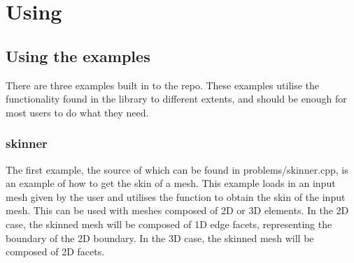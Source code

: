 \documentclass[12pt, letterpaper]{article}
\begin{document}
\section{Using}
\subsection{Using the examples}
There are three examples built in to the repo. These examples utilise  the functionality found in the library to different extents, and should be enough for most users to do what they need.

\subsubsection{skinner}
The first example, the source of which can be found in problems/skinner.cpp, is an example of how to get the skin of a mesh. This example loads in an input mesh given by the user and utilises the function  to obtain the skin of the input mesh. This can be used with meshes composed of 2D or 3D elements. In the 2D case, the skinned mesh will be composed of 1D edge facets, representing the boundary of the 2D boundary. In the 3D case, the skinned mesh will be composed of 2D facets. 
\end{document}
